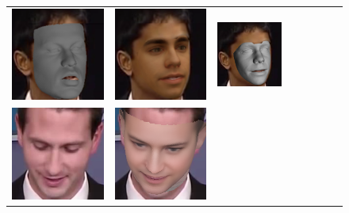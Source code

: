\begin{figure}[t!]
\begin{center}
\begin{tabular}{c@{\hskip 1.5mm}c@{\hskip 1mm}c@{\hskip 1.5mm}c@{\hskip 1mm}c@{\hskip 1.5mm}c@{\hskip 1mm}c@{\hskip 1mm}c@{}}
\includegraphics[width=\FittingFigWid]{img/Random/300VW_1_Richardson_shape.png} &
\includegraphics[width=\FittingFigWid]{img/Random/300VW_1_Tewari_rescon.png} &
\includegraphics[width=\FittingFigWid]{img/Random/300VW_1_Tewari_shape.png} &
\\
\includegraphics[width=\FittingFigWid]{img/Random/300VW_7_in.png} &
\includegraphics[width=\FittingFigWid]{img/Random/300VW_7_rescon.png} &

\end{tabular}
\end{center}
\end{figure}
